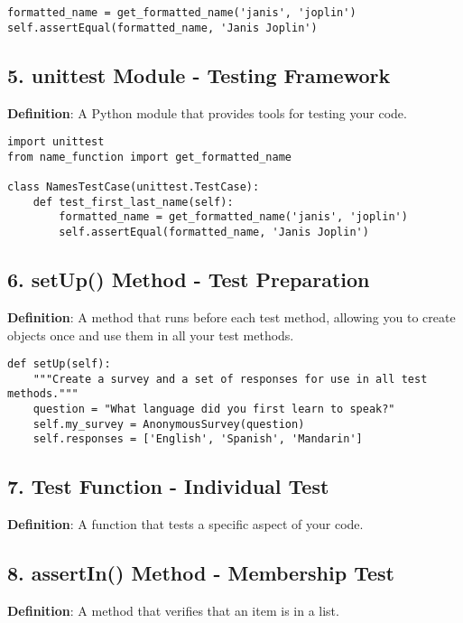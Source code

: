 \begin{lstlisting}
formatted_name = get_formatted_name('janis', 'joplin')
self.assertEqual(formatted_name, 'Janis Joplin')
\end{lstlisting}

\subsection*{5. unittest Module - Testing Framework}
\textbf{Definition}: A Python module that provides tools for testing your code.

\begin{lstlisting}
import unittest
from name_function import get_formatted_name

class NamesTestCase(unittest.TestCase):
    def test_first_last_name(self):
        formatted_name = get_formatted_name('janis', 'joplin')
        self.assertEqual(formatted_name, 'Janis Joplin')
\end{lstlisting}

\subsection*{6. setUp() Method - Test Preparation}
\textbf{Definition}: A method that runs before each test method, allowing you to create objects once and use them in all your test methods.

\begin{lstlisting}
def setUp(self):
    """Create a survey and a set of responses for use in all test methods."""
    question = "What language did you first learn to speak?"
    self.my_survey = AnonymousSurvey(question)
    self.responses = ['English', 'Spanish', 'Mandarin']
\end{lstlisting}

\subsection*{7. Test Function - Individual Test}
\textbf{Definition}: A function that tests a specific aspect of your code.



\subsection*{8. assertIn() Method - Membership Test}
\textbf{Definition}: A method that verifies that an item is in a list.


